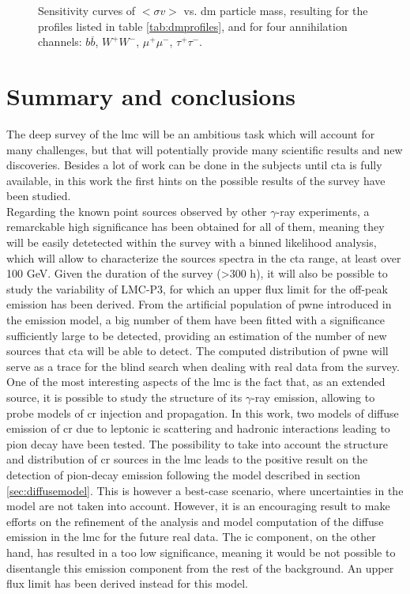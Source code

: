 \documentclass[main.tex]{subfiles}
\begin{document}
\begin{figure}
\endminipage
  \caption{Sensitivity curves of $<\sigma v >$ vs. \gls{dm} particle mass, resulting for the profiles listed in table \ref{tab:dmprofiles}, and for four annihilation channels: $b\overline b$, $W^+W^-$, $\mu^+ \mu^-$, $\tau^+ \tau^-$.}
    \label{fig:dmsensicurves}
\end{figure}

\section{Summary and conclusions}

The deep survey of the \gls{lmc} will be an ambitious task which will account for many challenges, but that will potentially provide many scientific results and new discoveries. Besides a lot of work can be done in the subjects until \gls{cta} is fully available, in this work the first hints on the possible results of the survey have been studied.\\
Regarding the known point sources observed by other $\gamma$-ray experiments, a remarckable high significance has been obtained for all of them, meaning they will be easily detetected within the survey with a binned likelihood analysis, which will allow to characterize the sources spectra in the \gls{cta} range, at least over 100 GeV. Given the duration of the survey (>300 h), it will also be possible to study the variability of LMC-P3, for which an upper flux limit for the off-peak emission has been derived. From the artificial population of \gls{pwne} introduced in the emission model, a big number of them have been fitted with a significance sufficiently large to be detected, providing an estimation of the number of new sources that \gls{cta} will be able to detect. The computed distribution of \gls{pwne} will serve as a trace for the blind search when dealing with real data from the survey.\\
One of the most interesting aspects of the \gls{lmc} is the fact that, as an extended source, it is possible to study the structure of its $\gamma$-ray emission, allowing to probe models of \gls{cr} injection and propagation. In this work, two models of diffuse emission of \gls{cr} due to leptonic \gls{ic} scattering and hadronic interactions leading to pion decay have been tested. The possibility to take into account the structure and distribution of \gls{cr} sources in the \gls{lmc} leads to the positive result on the detection of pion-decay emission following the model described in section \ref{sec:diffusemodel}. This is however a best-case scenario, where uncertainties in the model are not taken into account. However, it is an encouraging result to make efforts on the refinement of the analysis and model computation of the diffuse emission in the \gls{lmc} for the future real data. The \gls{ic} component, on the other hand, has resulted in a too low significance, meaning it would be not possible to disentangle this emission component from the rest of the background. An upper flux limit has been derived instead for this model.\\
\end{document}
